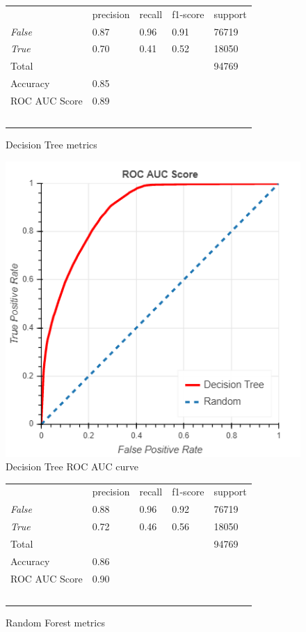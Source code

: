 \documentclass[10pt, conference, compsocconf]{IEEEtran}
\begin{document}
\begin{figure}
  \begin{tabular}{lllll}
                  & precision & recall      & f1-score  & support \\
  \textit{False}  & 0.87      & 0.96        & 0.91      & 76719 \\
  \textit{True}   & 0.70      & 0.41        & 0.52      & 18050 \\
  Total			      &           &             &           & 94769 \\
  Accuracy        & 0.85 \\
  ROC AUC Score	  & 0.89 \\\
  \end{tabular}
  \caption{Decision Tree metrics}
  \label{fig:decision_tree_metrics}
\end{figure}

\begin{figure}
  \includegraphics[scale=0.45]{decision_tree_roc}
  \centering
  \caption{Decision Tree ROC AUC curve}
  \label{fig:decision_tree_roc}
\end{figure}


\begin{figure}
  \begin{tabular}{lllll}
                  & precision & recall      & f1-score  & support \\
  \textit{False}  & 0.88      & 0.96        & 0.92      & 76719 \\
  \textit{True}   & 0.72      & 0.46        & 0.56      & 18050 \\
  Total			      &           &             &           & 94769 \\
  Accuracy        & 0.86 \\
  ROC AUC Score	  & 0.90 \\\
  \end{tabular}
  \caption{Random Forest metrics}
  \label{fig:random_Forest_metrics}
\end{figure}
\end{document}
